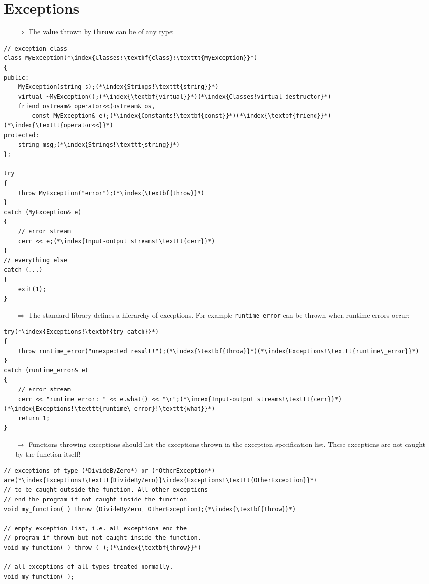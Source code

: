 \documentclass[10pt]{book}
\begin{document}
\section{Exceptions}
\begin{enumerate}
\item[$\Rightarrow$] The value thrown by \textbf{throw} can be of any type:
\end{enumerate}
\begin{lstlisting}
// exception class
class MyException(*\index{Classes!\textbf{class}!\texttt{MyException}}*)
{
public:
    MyException(string s);(*\index{Strings!\texttt{string}}*)
    virtual ~MyException();(*\index{\textbf{virtual}}*)(*\index{Classes!virtual destructor}*)
    friend ostream& operator<<(ostream& os,
        const MyException& e);(*\index{Constants!\textbf{const}}*)(*\index{\textbf{friend}}*)(*\index{\texttt{operator<<}}*)
protected:
    string msg;(*\index{Strings!\texttt{string}}*)
};

try
{
    throw MyException("error");(*\index{\textbf{throw}}*)
}
catch (MyException& e)
{
    // error stream
    cerr << e;(*\index{Input-output streams!\texttt{cerr}}*)
}
// everything else
catch (...)
{
    exit(1);
}
\end{lstlisting}
\begin{enumerate}
\item[$\Rightarrow$] The standard library defines a hierarchy of exceptions.  For example \texttt{runtime\_error} can be thrown when runtime errors occur:
\end{enumerate}
\begin{lstlisting}
try(*\index{Exceptions!\textbf{try-catch}}*)
{
    throw runtime_error("unexpected result!");(*\index{\textbf{throw}}*)(*\index{Exceptions!\texttt{runtime\_error}}*)
}
catch (runtime_error& e)
{
    // error stream
    cerr << "runtime error: " << e.what() << "\n";(*\index{Input-output streams!\texttt{cerr}}*)(*\index{Exceptions!\texttt{runtime\_error}!\texttt{what}}*)
    return 1;
}
\end{lstlisting}
\begin{enumerate}
\item[$\Rightarrow$] Functions throwing exceptions should list the exceptions thrown in
the exception specification list. These exceptions are not caught by the function itself!
\end{enumerate}
\begin{lstlisting}
// exceptions of type (*DivideByZero*) or (*OtherException*) are(*\index{Exceptions!\texttt{DivideByZero}}\index{Exceptions!\texttt{OtherException}}*)
// to be caught outside the function. All other exceptions 
// end the program if not caught inside the function.
void my_function( ) throw (DivideByZero, OtherException);(*\index{\textbf{throw}}*)

// empty exception list, i.e. all exceptions end the
// program if thrown but not caught inside the function.
void my_function( ) throw ( );(*\index{\textbf{throw}}*)

// all exceptions of all types treated normally.
void my_function( );
\end{lstlisting}
\end{document}
